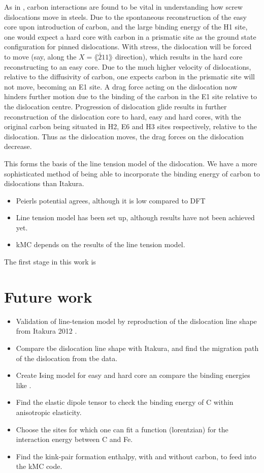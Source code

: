 \documentclass[a4paper,11pt]{article}
\begin{document}
As in \cite{Lthi2019}, carbon interactions are found to be vital in understanding how screw
dislocations move in steels. Due to the spontaneous reconstruction of the easy core upon
introduction of carbon, and the large binding energy of the H1 site, one would expect a hard
core with carbon in a prismatic site as the ground state configuration for pinned
dislocations. With stress, the dislocation will be forced to move (say, along the \(X =
    \lang\bar{2}11\rang\) direction), which results in the hard core reconstructing to an easy core. Due to
the much higher velocity of dislocations, relative to the diffusivity of carbon, one expects
carbon in the prismatic site will not move, becoming an E1 site. A drag force acting on the
dislocation now hinders further motion due to the binding of the carbon in the E1
site relative to the dislocation centre. Progression of dislocation glide results in further
reconstruction of the dislocation core to hard, easy and hard cores, with the original carbon being situated in H2, E6 and H3
sites respectively, relative to the dislocation. Thus as the dislocation moves, the drag forces
on the dislocation decrease.

This forms the basis of the line tension model of the dislocation. We have a more sophisticated
method of being able to incorporate the binding energy of carbon to dislocations than Itakura. 

\begin{itemize}
\item Peierls potential agrees, although it is low compared to DFT
\item Line tension model has been set up, although results have not been achieved yet.
\item kMC depends on the results of the line tension model.
\end{itemize}

The first stage in this work is 



\section{Future work}
\label{sec:org9fb6611}

\begin{itemize}
\item Validation of line-tension model by reproduction of the dislocation line shape from
Itakura 2012 \cite{Itakura2012}.
\item Compare tbe dislocation line shape with Itakura, and find the migration path of the dislocation from tbe data.
\item\relax [Optional] Create Ising model for easy and hard core an compare the binding energies like \cite{Lthi2019}.
\item\relax [Optional] Find the elastic dipole tensor to check the binding energy of C within anisotropic elasticity.
\item Choose the sites for which one can fit a function (lorentzian) for the interaction energy between C and Fe.
\item Find the kink-pair formation enthalpy, with and without carbon, to feed into the kMC
code.
\end{itemize}
\end{document}
